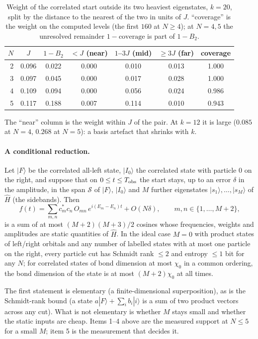 \begin{table}[ht]
\centering\small
\caption{Weight of the correlated start outside its two heaviest eigenstates, $k=20$, split by the distance to the nearest of the two in units of $J$. ``coverage'' is the weight on the computed levels (the first $160$ at $N\ge4$); at $N=4,5$ the unresolved remainder $1-\text{coverage}$ is part of $1-B_2$.}
\label{tab:dress-draft}
\begin{tabular}{rcccccc}
\toprule
$N$ & $J$ & $1-B_2$ & $<J$ (near) & $1$--$3J$ (mid) & $\ge3J$ (far) & coverage \\
\midrule
2 & 0.096 & 0.022 & 0.000 & 0.010 & 0.013 & 1.000 \\
3 & 0.097 & 0.045 & 0.000 & 0.017 & 0.028 & 1.000 \\
4 & 0.109 & 0.094 & 0.000 & 0.056 & 0.024 & 0.986 \\
5 & 0.117 & 0.188 & 0.007 & 0.114 & 0.010 & 0.943 \\
\bottomrule
\end{tabular}
\end{table}
The ``near'' column is the weight within $J$ of the pair. At $k=12$ it is large ($0.085$ at $N=4$, $0.268$ at $N=5$): a basis artefact that shrinks with $k$.

\paragraph{A conditional reduction.}
\begin{proposition}[conditional]
Let $|F\rangle$ be the correlated all-left state, $|I_0\rangle$ the correlated state with particle $0$ on the right, and suppose that on $0\le t\le T_{\rm obs}$ the start stays, up to an error $\delta$ in the amplitude, in the span $\mathcal S$ of $|F\rangle$, $|I_0\rangle$ and $M$ further eigenstates $|s_1\rangle,\dots,|s_M\rangle$ of $\hat H$ (the sidebands). Then
\[
f(t)=\sum_{m,n}c_m^\ast c_n\,O_{mn}\,e^{i(E_m-E_n)t}+O(N\delta),\qquad m,n\in\{1,\dots,M+2\},
\]
is a sum of at most $(M+2)(M+3)/2$ cosines whose frequencies, weights and amplitudes are static quantities of $\hat H$. In the ideal case $M=0$ with product states of left/right orbitals and any number of labelled states with at most one particle on the right, every particle cut has Schmidt rank $\le2$ and entropy $\le1$ bit for any $N$; for correlated states of bond dimension at most $\chi_0$ in a common ordering, the bond dimension of the state is at most $(M+2)\chi_0$ at all times.
\end{proposition}
The first statement is elementary (a finite-dimensional superposition), as is the Schmidt-rank bound (a state $a|F\rangle+\sum_ib_i|i\rangle$ is a sum of two product vectors across any cut). What is not elementary is whether $M$ stays small and whether the static inputs are cheap. Items 1--4 above are the measured support at $N\le5$ for a small $M$; item 5 is the measurement that decides it.


